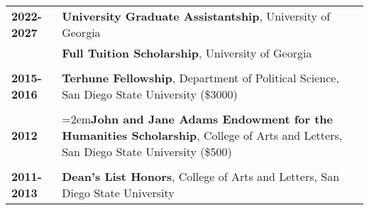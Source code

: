 \documentclass[letterpaper,12pt]{article}
\begin{document}
\begin{xltabular}{\dimexpr\textwidth-0in}{p{.85in}X}
\textbf{2022-2027} & \textbf{University Graduate Assistantship}, University of Georgia\\
                              & \textbf{Full Tuition Scholarship}, University of Georgia\\ \\
\textbf{2015-2016} & \textbf{Terhune Fellowship}, Department of Political Science, San Diego State University (\$3000)\\ \\
\textbf{2012}          & \hangindent=2em\textbf{John and Jane Adams Endowment for the Humanities Scholarship}, College of Arts and Letters, San Diego State University (\$500)\\ \\
\textbf{2011-2013} & \textbf{Dean's List Honors}, College of Arts and Letters, San Diego State University
\end{xltabular}

\end{document}
